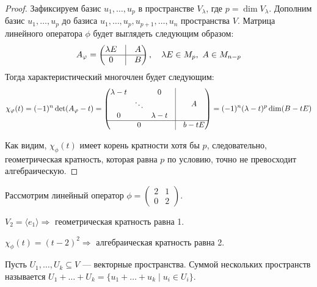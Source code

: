 \begin{proof}
	Зафиксируем базис $u_1, \ldots, u_p$ в пространстве $V_\lambda$, где $p = \dim{V_\lambda}$. Дополним базис $u_1, \ldots, u_p$ до базиса $u_1, \ldots, u_p, u_{p+1}, \ldots, u_n$ пространства $V$. Матрица линейного оператора $\phi$ будет выглядеть следующим образом:
	\begin{gather*}
	A_\phi = 
		\begin{pmatrix}
		\lambda E
		& \vline & 
		A \\
		\hline
		0
		& \vline & 
    	B
		\end{pmatrix}, \quad \lambda E \in M_p,\ A \in M_{n-p}
	\end{gather*}
	Тогда характеристический многочлен будет следующим:
	\begin{gather*}
	\chi_\phi(t) = (-1)^n \det (A_\phi - t) = 
	\begin{pmatrix}
	\begin{matrix}
	\lambda - t &  & 0 \\
	 & \ddots &  \\
	0 &  & \lambda - t
	\end{matrix}
	& \vline &
	A \\
	\hline
	0 & \vline & b - tE
	\end{pmatrix}
	 = (-1)^n(\lambda - t)^p\dim(B - tE)
	\end{gather*}
	
	Как видим, $\chi_\phi(t)$ имеет корень кратности хотя бы $p$, следовательно, геометрическая кратность, которая равна $p$ по условию, точно не превосходит алгебраическую. 
\end{proof}

\begin{Examples} Рассмотрим линейный оператор $\phi = \begin{pmatrix}
    2& 1 \\
    0& 2
    \end{pmatrix}$.
        
    $V_2 = \langle e_1\rangle \Rightarrow$ геометрическая кратность равна 1.
    
    $\chi_\phi(t) = (t-2)^2 \Rightarrow$ алгебраическая кратность равна 2.
\end{Examples}

\begin{Def}
	Пусть $U_1, \ldots, U_k \subseteq V$ --- векторные пространства. Суммой нескольких пространств называется $U_1 + \ldots + U_k = \{u_1 + \ldots + u_k \; | \; u_i \in U_i \}$.
\end{Def}

